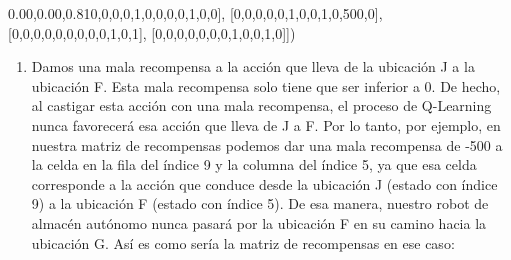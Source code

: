 \documentclass[]{book}
\newenvironment{Shaded}{\begin{snugshade}}{\end{snugshade}}
\newcommand{\DecValTok}[1]{\textcolor[rgb]{0.00,0.00,0.81}{#1}}
\newcommand{\NormalTok}[1]{#1}
\providecommand{\tightlist}{%
  \setlength{\itemsep}{0pt}\setlength{\parskip}{0pt}}
\begin{document}
\begin{Shaded}
\begin{Highlighting}[]
\NormalTok{          [}\DecValTok{0}\NormalTok{,}\DecValTok{0}\NormalTok{,}\DecValTok{0}\NormalTok{,}\DecValTok{0}\NormalTok{,}\DecValTok{1}\NormalTok{,}\DecValTok{0}\NormalTok{,}\DecValTok{0}\NormalTok{,}\DecValTok{0}\NormalTok{,}\DecValTok{0}\NormalTok{,}\DecValTok{1}\NormalTok{,}\DecValTok{0}\NormalTok{,}\DecValTok{0}\NormalTok{],}
\NormalTok{          [}\DecValTok{0}\NormalTok{,}\DecValTok{0}\NormalTok{,}\DecValTok{0}\NormalTok{,}\DecValTok{0}\NormalTok{,}\DecValTok{0}\NormalTok{,}\DecValTok{1}\NormalTok{,}\DecValTok{0}\NormalTok{,}\DecValTok{0}\NormalTok{,}\DecValTok{1}\NormalTok{,}\DecValTok{0}\NormalTok{,}\DecValTok{500}\NormalTok{,}\DecValTok{0}\NormalTok{],}
\NormalTok{          [}\DecValTok{0}\NormalTok{,}\DecValTok{0}\NormalTok{,}\DecValTok{0}\NormalTok{,}\DecValTok{0}\NormalTok{,}\DecValTok{0}\NormalTok{,}\DecValTok{0}\NormalTok{,}\DecValTok{0}\NormalTok{,}\DecValTok{0}\NormalTok{,}\DecValTok{0}\NormalTok{,}\DecValTok{1}\NormalTok{,}\DecValTok{0}\NormalTok{,}\DecValTok{1}\NormalTok{],}
\NormalTok{          [}\DecValTok{0}\NormalTok{,}\DecValTok{0}\NormalTok{,}\DecValTok{0}\NormalTok{,}\DecValTok{0}\NormalTok{,}\DecValTok{0}\NormalTok{,}\DecValTok{0}\NormalTok{,}\DecValTok{0}\NormalTok{,}\DecValTok{1}\NormalTok{,}\DecValTok{0}\NormalTok{,}\DecValTok{0}\NormalTok{,}\DecValTok{1}\NormalTok{,}\DecValTok{0}\NormalTok{]])}
\end{Highlighting}
\end{Shaded}

\begin{enumerate}
\def\labelenumi{\arabic{enumi}.}
\setcounter{enumi}{1}
\tightlist
\item
  Damos una mala recompensa a la acción que lleva de la ubicación J a la ubicación F. Esta mala recompensa solo tiene que ser inferior a 0. De hecho, al castigar esta acción con una mala recompensa, el proceso de Q-Learning nunca favorecerá esa acción que lleva de J a F. Por lo tanto, por ejemplo, en nuestra matriz de recompensas podemos dar una mala recompensa de -500 a la celda en la fila del índice 9 y la columna del índice 5, ya que esa celda corresponde a la acción que conduce desde la ubicación J (estado con índice 9) a la ubicación F (estado con índice 5). De esa manera, nuestro robot de almacén autónomo nunca pasará por la ubicación F en su camino hacia la ubicación G. Así es como sería la matriz de recompensas en ese caso:
\end{enumerate}
\end{document}
